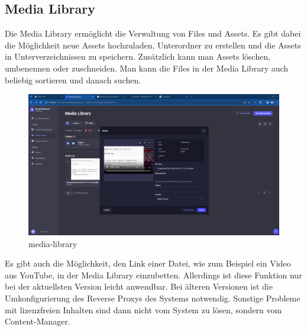 \subsection{Media Library}

Die Media Library ermöglicht die Verwaltung von Files und Assets.
Es gibt dabei die Möglichkeit neue Assets hochzuladen, Unterordner zu erstellen und die Assets in Unterverzeichnissen zu speichern.
Zusätzlich kann man Assets löschen, umbenennen oder zuschneiden.
Man kann die Files in der Media Library auch beliebig sortieren und danach suchen.
\cite{media-library}

\begin{figure}[H]
  \centering
  \includegraphics[width=\textwidth]{./pics/media-library.png}
  \caption{media-library}

\end{figure}

Es gibt auch die Möglichkeit, den Link einer Datei, wie zum Beispiel ein Video aus YouTube, in der Media Library
einzubetten. Allerdings ist diese Funktion nur bei der aktuellsten Version leicht anwendbar. Bei älteren Versionen
ist die Umkonfigurierung des Reverse Proxys des Systems notwendig. Sonstige Probleme mit lizenzfreien Inhalten
sind dann nicht vom System zu lösen, sondern vom Content-Manager.
\cite{url-upload-problem}





